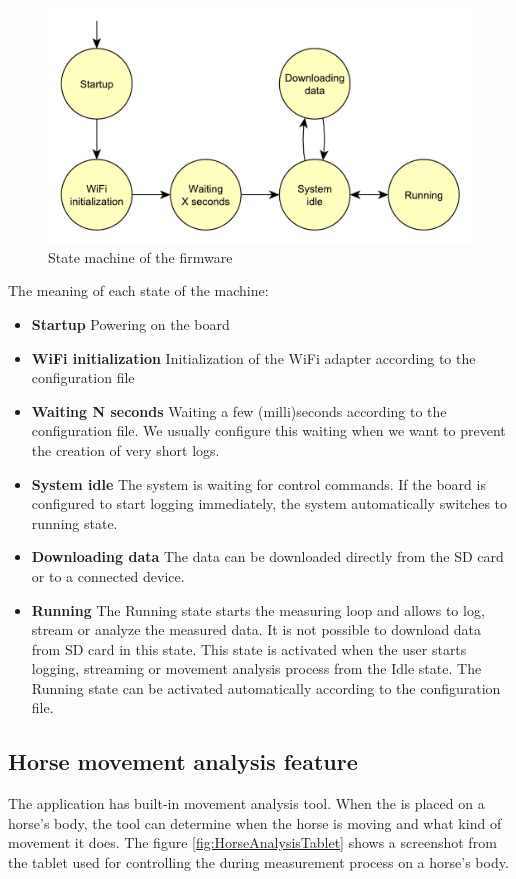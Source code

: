 \begin{figure}
    \centering
    \caption{State machine of the firmware}
    \label{firmwareStateMachine}
    \includegraphics[width=\linewidth]{img/firmwareStateMachine.pdf}
\end{figure}

The meaning of each state of the machine:
\begin{itemize}
    \item \textbf{Startup} Powering on the board
    \item \textbf{WiFi initialization} Initialization of the WiFi adapter according to the configuration file
    \item \textbf{Waiting N seconds} Waiting a few (milli)seconds according to the configuration file. We usually configure this waiting when we want to prevent the creation of very short logs.
    \item \textbf{System idle} The system is waiting for control commands. If the board is configured to start logging immediately, the system automatically switches to running state.
    \item \textbf{Downloading data} The data can be downloaded directly from the SD card or to a connected device.
    \item \textbf{Running} The Running state starts the measuring loop and allows to log, stream or analyze the measured data. It is not possible to download data from SD card in this state. This state is activated when the user starts logging, streaming or movement analysis process from the Idle state. The Running state can be activated automatically according to the configuration file.
\end{itemize}

\subsection{Horse movement analysis feature}
The application has built-in movement analysis tool. When the  is placed on a horse's body, the tool can determine when the horse is moving and what kind of movement it does. The figure \ref{fig:HorseAnalysisTablet} shows a screenshot from the tablet used for controlling the  during measurement process on a horse's body.

